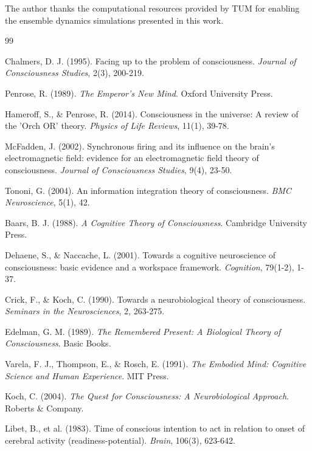 \documentclass[12pt,a4paper]{article}
\begin{document}
The author thanks the computational resources provided by TUM for enabling the ensemble dynamics simulations presented in this work.


\begin{thebibliography}{99}

Chalmers, D. J. (1995). Facing up to the problem of consciousness. \textit{Journal of Consciousness Studies}, 2(3), 200-219.

Penrose, R. (1989). \textit{The Emperor's New Mind}. Oxford University Press.

Hameroff, S., \& Penrose, R. (2014). Consciousness in the universe: A review of the 'Orch OR' theory. \textit{Physics of Life Reviews}, 11(1), 39-78.

McFadden, J. (2002). Synchronous firing and its influence on the brain's electromagnetic field: evidence for an electromagnetic field theory of consciousness. \textit{Journal of Consciousness Studies}, 9(4), 23-50.

Tononi, G. (2004). An information integration theory of consciousness. \textit{BMC Neuroscience}, 5(1), 42.

Baars, B. J. (1988). \textit{A Cognitive Theory of Consciousness}. Cambridge University Press.

Dehaene, S., \& Naccache, L. (2001). Towards a cognitive neuroscience of consciousness: basic evidence and a workspace framework. \textit{Cognition}, 79(1-2), 1-37.

Crick, F., \& Koch, C. (1990). Towards a neurobiological theory of consciousness. \textit{Seminars in the Neurosciences}, 2, 263-275.

Edelman, G. M. (1989). \textit{The Remembered Present: A Biological Theory of Consciousness}. Basic Books.

Varela, F. J., Thompson, E., \& Rosch, E. (1991). \textit{The Embodied Mind: Cognitive Science and Human Experience}. MIT Press.

Koch, C. (2004). \textit{The Quest for Consciousness: A Neurobiological Approach}. Roberts \& Company.

Libet, B., et al. (1983). Time of conscious intention to act in relation to onset of cerebral activity (readiness-potential). \textit{Brain}, 106(3), 623-642.


\end{thebibliography}
\end{document}
